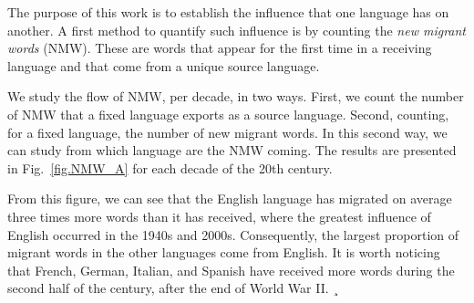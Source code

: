 \documentclass[10pt,letterpaper]{article} %
\newcommand{\Fref}[1]{Fig.~\ref{#1}}
\begin{document}
The purpose of this work is to establish the influence that one language has on
another. A first method to quantify such influence is by counting the
\textit{new migrant words} (NMW). These are words that appear for the first time in a
receiving language and that come from a unique source language.


We study the flow of NMW, per decade, in two ways. First, we
count the number of NMW that a fixed language exports as a source
language. Second, counting, for a fixed language, the number
of new migrant words. In this second way, we can study from 
which language are the NMW coming.  The results are presented in 
\Fref{fig.NMW_A} for each decade of the 20th century. 

% 

From this figure, we can see that the English language has
migrated on average three times more words than it has received, where the
greatest influence of English occurred in the 1940s and 2000s.
Consequently, the
largest proportion of migrant words in the other languages come
from English. It is worth noticing that French, German, Italian, and Spanish have received more words
during the second half of the century, after the end of World War II. 
¸
\end{document}
